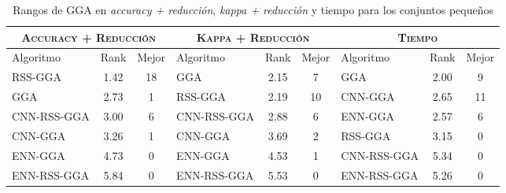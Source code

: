 \begin{table}[h!]
\centering
\begin{adjustbox}{max width =\textwidth}
\begin{tabular}{l c c|l c c|l c c}
\hline
\multicolumn{3}{c|}{\textsc{Accuracy + Reducción}}
	& \multicolumn{3}{c|}{\textsc{Kappa + Reducción}}
	& \multicolumn{3}{c}{\textsc{Tiempo}} \\
\hline
Algoritmo & Rank & Mejor & Algoritmo & Rank & Mejor & Algoritmo & Rank & Mejor \\
\hline
\hline

RSS-GGA     & 1.42 & 18 & GGA         & 2.15 & 7  & GGA         & 2.00 & 9  \\
GGA         & 2.73 & 1  & RSS-GGA     & 2.19 & 10 & CNN-GGA     & 2.65 & 11 \\
CNN-RSS-GGA & 3.00 & 6  & CNN-RSS-GGA & 2.88 & 6  & ENN-GGA     & 2.57 & 6  \\
CNN-GGA     & 3.26 & 1  & CNN-GGA     & 3.69 & 2  & RSS-GGA     & 3.15 & 0  \\
ENN-GGA     & 4.73 & 0  & ENN-GGA     & 4.53 & 1  & CNN-RSS-GGA & 5.34 & 0  \\
ENN-RSS-GGA & 5.84 & 0  & ENN-RSS-GGA & 5.53 & 0  & ENN-RSS-GGA & 5.26 & 0  \\


\hline
\end{tabular}
\end{adjustbox}
\caption{Rangos de GGA en \emph{accuracy + reducción}, \emph{kappa + reducción} y tiempo para los conjuntos pequeños}
\label{rank-gga-peq}
\end{table} 


